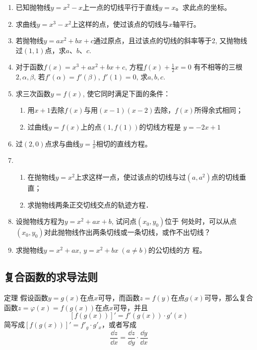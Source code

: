 \begin{ex}
\begin{enumerate}
\item 已知抛物线$y=x^2-x$上一点的切线平行于直线$y=x$。求此点的坐标。
\item 求曲线$y=x^3-x^2$上这样的点，使过该点的切线与$x$轴平行。
\item 若抛物线$y=ax^2+bx+c$通过原点，且过该点的切线的斜率等于2, 又抛物线过$(1, 1)$点，求$a$、$b$、$c$.
\item 对于函数$f(x)=x^3+ax^2+bx+c$, 方程$f(x)+\frac{1}{2}x=0$
有不相等的三根$2,\alpha,\beta$, 若$f'(\alpha)=f'(\beta)$, $f'(1)=0$, 求$a,b,c$.
\item 求三次函数$y=f(x)$, 使它同时满足下面的条件：
\begin{enumerate}
    \item 用$x+1$去除$f(x)$与用$(x-1)(x-2)$去除，$f(x)$所得余式相同；
    \item 过曲线$y=f(x)$上的点$(1,f(1))$的切线方程是
$y=-2x+1$
\end{enumerate}
\item 
过$(2, 0)$点求与曲线$y=\frac{1}{x}$相切的直线方程。
\item 
\begin{enumerate}
\item 在抛物线$y=x^2$上求这样一点，使过该点的切线与过$(a,a^2)$点的切线垂直；
\item 求抛物线两条正交切线交点的轨迹方程．
\end{enumerate}

\item 设抛物线方程为$y=x^2+ax+b$, 试问点$(x_0,y_0)$位于
何处时，可以从点$(x_0,y_0)$对此抛物线作出两条切线或一条切线，或作不出切线？
\item 求抛物线$y=x^2+ax$, $y=x^2+bx\; (a\ne b)$的公切线的方
程。
\end{enumerate} 
\end{ex}

\subsection{复合函数的求导法则}
\begin{blk}
    {定理} 假设函数$y=g(x)$在点$x$可导，而函数$z=f(y)$在点$g(x)$可导，那么复合函数$z=\varphi(x)=f(g(x))$在点$x$可导，并且
\[[f(g(x))]'=f'(g(x))\cdot g'(x)\]
简写成$[f(g(x))]'=f'_g\cdot g'_x$，或者写成
\[\frac{\dd z}{\dd x}=\frac{\dd z}{\dd y}\cdot \frac{\dd y}{\dd x}\]
\end{blk}

